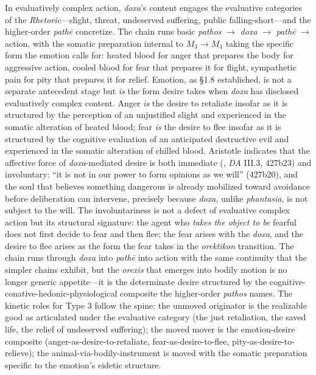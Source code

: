 In evaluatively complex action, \textit{doxa}'s content engages the evaluative categories of the \textit{Rhetoric}---slight, threat, undeserved suffering, public falling-short---and the higher-order \textit{pathē} concretize. The chain runs basic \textit{pathos} $\rightarrow$ \textit{doxa} $\rightarrow$ \textit{pathē} $\rightarrow$ action, with the somatic preparation internal to $M_3 \rightarrow M_4$ taking the specific form the emotion calls for: heated blood for anger that prepares the body for aggressive action, cooled blood for fear that prepares it for flight, sympathetic pain for pity that prepares it for relief. Emotion, as \S 1.8 established, is not a separate antecedent stage but \textit{is} the form desire takes when \textit{doxa} has disclosed evaluatively complex content. Anger \textit{is} the desire to retaliate insofar as it is structured by the perception of an unjustified slight and experienced in the somatic alteration of heated blood; fear \textit{is} the desire to flee insofar as it is structured by the cognitive evaluation of an anticipated destructive evil and experienced in the somatic alteration of chilled blood. Aristotle indicates that the affective force of \textit{doxa}-mediated desire is both immediate (, \textit{DA} III.3, 427b23) and involuntary: ``it is not in our power to form opinions as we will'' (427b20), and the soul that believes something dangerous is already mobilized toward avoidance before deliberation can intervene, precisely because \textit{doxa}, unlike \textit{phantasia}, is not subject to the will. The involuntariness is not a defect of evaluative complex action but its structural signature: the agent who \textit{takes the object to be} fearful does not first decide to fear and then flee; the fear arises with the \textit{doxa}, and the desire to flee arises as the form the fear takes in the \textit{orektikon} transition. The chain runs through \textit{doxa} into \textit{pathē} into action with the same continuity that the simpler chains exhibit, but the \textit{orexis} that emerges into bodily motion is no longer generic appetite---it is the determinate desire structured by the cognitive-conative-hedonic-physiological composite the higher-order \textit{pathos} names. The kinetic roles for Type 3 follow the spine: the unmoved originator is the realizable good as articulated under the evaluative category (the just retaliation, the saved life, the relief of undeserved suffering); the moved mover is the emotion-desire composite (anger-as-desire-to-retaliate, fear-as-desire-to-flee, pity-as-desire-to-relieve); the animal-via-bodily-instrument is moved with the somatic preparation specific to the emotion's eidetic structure.

